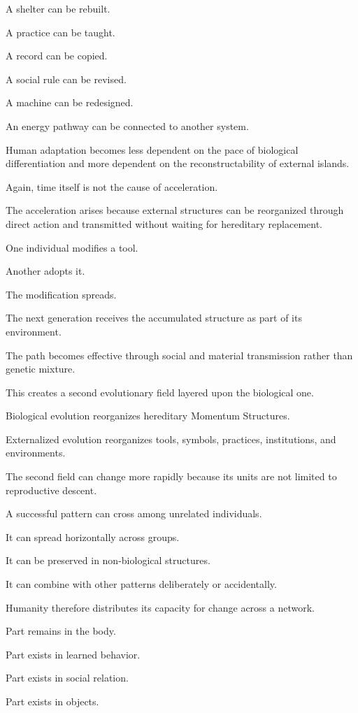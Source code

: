 A shelter can be rebuilt.

A practice can be taught.

A record can be copied.

A social rule can be revised.

A machine can be redesigned.

An energy pathway can be connected to another system.

Human adaptation becomes less dependent on the pace of biological differentiation and more dependent on the reconstructability of external islands.

Again, time itself is not the cause of acceleration.

The acceleration arises because external structures can be reorganized through direct action and transmitted without waiting for hereditary replacement.

One individual modifies a tool.

Another adopts it.

The modification spreads.

The next generation receives the accumulated structure as part of its environment.

The path becomes effective through social and material transmission rather than genetic mixture.

This creates a second evolutionary field layered upon the biological one.

Biological evolution reorganizes hereditary Momentum Structures.

Externalized evolution reorganizes tools, symbols, practices, institutions, and environments.

The second field can change more rapidly because its units are not limited to reproductive descent.

A successful pattern can cross among unrelated individuals.

It can spread horizontally across groups.

It can be preserved in non-biological structures.

It can combine with other patterns deliberately or accidentally.

Humanity therefore distributes its capacity for change across a network.

Part remains in the body.

Part exists in learned behavior.

Part exists in social relation.

Part exists in objects.

